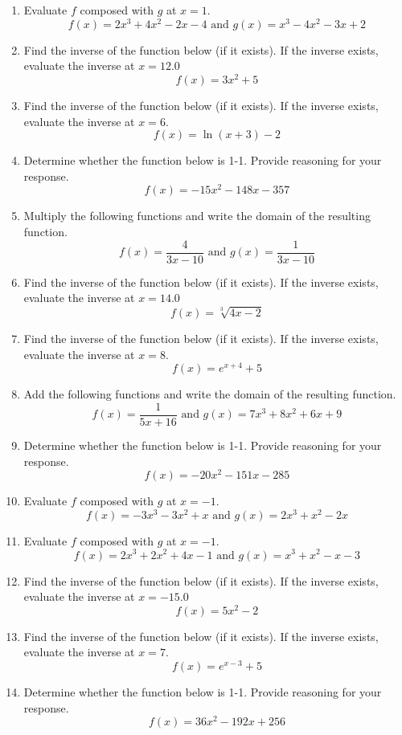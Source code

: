 \documentclass[14pt]{extbook}
\begin{document}
\begin{enumerate}
\item{
Evaluate $f$ composed with $g$ at $x=1$.\[ f(x) = 2x^{3} +4 x^{2} -2 x -4 \text{ and } g(x) = x^{3} -4 x^{2} -3 x + 2 \]} \newpage
\item{
Find the inverse of the function below (if it exists). If the inverse exists, evaluate the inverse at $x = 12.0$\[ f(x) = 3 x^2 + 5 \]} \newpage
\item{
Find the inverse of the function below (if it exists). If the inverse exists, evaluate the inverse at $x = 6$.\[ f(x) = \ln{(x+3)}-2 \]} \newpage
\item{
Determine whether the function below is 1-1. Provide reasoning for your response.\[ f(x) = -15 x^2 - 148 x - 357 \]} \newpage
\item{
Multiply the following functions and write the domain of the resulting function.\[ f(x) = \frac{4}{3x-10} \text{ and } g(x) = \frac{1}{3x-10} \]} \newpage
\item{
Find the inverse of the function below (if it exists). If the inverse exists, evaluate the inverse at $x = 14.0$\[ f(x) = \sqrt[3]{4 x - 2} \]} \newpage
\item{
Find the inverse of the function below (if it exists). If the inverse exists, evaluate the inverse at $x = 8$.\[ f(x) = e^{x+4}+5 \]} \newpage
\item{
Add the following functions and write the domain of the resulting function.\[ f(x) = \frac{1}{5x+16} \text{ and } g(x) = 7x^{3} +8 x^{2} +6 x + 9 \]} \newpage
\item{
Determine whether the function below is 1-1. Provide reasoning for your response.\[ f(x) = -20 x^2 - 151 x - 285 \]} \newpage
\item{
Evaluate $f$ composed with $g$ at $x=-1$.\[ f(x) = -3x^{3} -3 x^{2} +x \text{ and } g(x) = 2x^{3} + x^{2} -2 x \]} \newpage
\item{
Evaluate $f$ composed with $g$ at $x=-1$.\[ f(x) = 2x^{3} +2 x^{2} +4 x -1 \text{ and } g(x) = x^{3} + x^{2} -x -3 \]} \newpage
\item{
Find the inverse of the function below (if it exists). If the inverse exists, evaluate the inverse at $x = -15.0$\[ f(x) = 5 x^2 - 2 \]} \newpage
\item{
Find the inverse of the function below (if it exists). If the inverse exists, evaluate the inverse at $x = 7$.\[ f(x) = e^{x-3}+5 \]} \newpage
\item{
Determine whether the function below is 1-1. Provide reasoning for your response.\[ f(x) = 36 x^2 - 192 x + 256 \]} \newpage

\end{enumerate}
\end{document}
